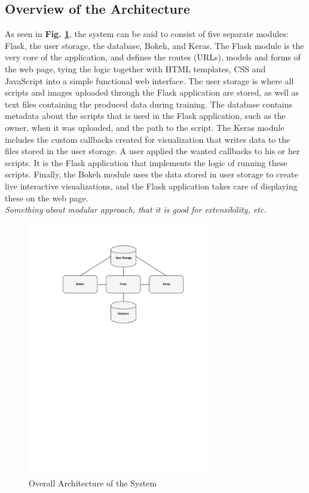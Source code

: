 \subsection{Overview of the Architecture}

As seen in \textbf{Fig. \ref{architecture1}}, the system can be said to consist of five separate modules: Flask, the user storage, the database, Bokeh, and Keras. The Flask module is the very core of the application, and defines the routes (URLs), models and forms of the web page, tying the logic together with HTML templates, CSS and JavaScript into a simple functional web interface. The user storage is where all scripts and images uploaded through the Flask application are stored, as well as text files containing the produced data during training. The database contains metadata about the scripts that is used in the Flask application, such as the owner, when it was uploaded, and the path to the script. The Keras module includes the custom callbacks created for visualization that writes data to the files stored in the user storage. A user applied the wanted callbacks to his or her scripts. It is the Flask application that implements the logic of running these scripts. Finally, the Bokeh module uses the data stored in user storage to create live interactive visualizations, and the Flask application takes care of displaying these on the web page. \\

\noindent \textit{Something about modular approach, that it is good for extensibility, etc.}


\begin{figure}[h!]
    \centering
        \includegraphics[width=0.7\textwidth]{fig/overall-architecture.pdf}
        \caption{Overall Architecture of the System}
        \label{architecture1}
\end{figure}

